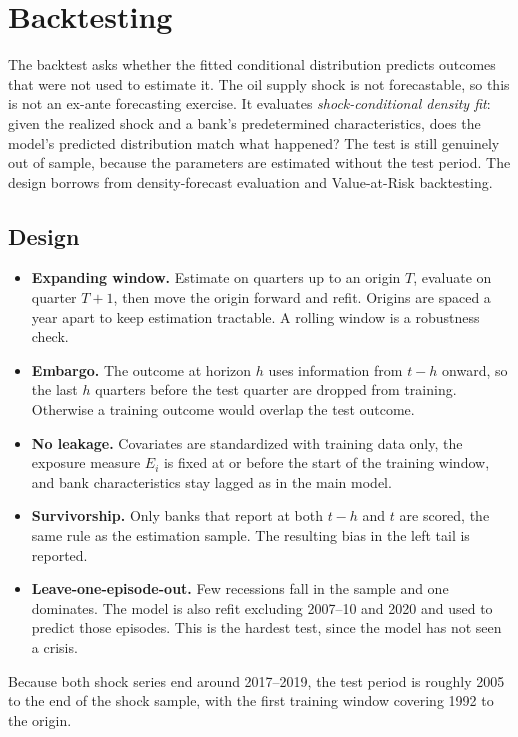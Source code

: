 \documentclass[11pt]{article}
\begin{document}
\section{Backtesting}\label{sec:backtest}

The backtest asks whether the fitted conditional distribution predicts outcomes that were not used to estimate it. The oil supply shock is not forecastable, so this is not an ex-ante forecasting exercise. It evaluates \emph{shock-conditional density fit}: given the realized shock and a bank's predetermined characteristics, does the model's predicted distribution match what happened? The test is still genuinely out of sample, because the parameters are estimated without the test period. The design borrows from density-forecast evaluation \citep{gneiting2007} and Value-at-Risk backtesting.

\subsection{Design}

\begin{itemize}
  \item \textbf{Expanding window.} Estimate on quarters up to an origin $T$, evaluate on quarter $T+1$, then move the origin forward and refit. Origins are spaced a year apart to keep estimation tractable. A rolling window is a robustness check.
  \item \textbf{Embargo.} The outcome at horizon $h$ uses information from $t-h$ onward, so the last $h$ quarters before the test quarter are dropped from training. Otherwise a training outcome would overlap the test outcome.
  \item \textbf{No leakage.} Covariates are standardized with training data only, the exposure measure $E_i$ is fixed at or before the start of the training window, and bank characteristics stay lagged as in the main model.
  \item \textbf{Survivorship.} Only banks that report at both $t-h$ and $t$ are scored, the same rule as the estimation sample. The resulting bias in the left tail is reported.
  \item \textbf{Leave-one-episode-out.} Few recessions fall in the sample and one dominates. The model is also refit excluding 2007--10 and 2020 and used to predict those episodes. This is the hardest test, since the model has not seen a crisis.
\end{itemize}
Because both shock series end around 2017--2019, the test period is roughly 2005 to the end of the shock sample, with the first training window covering 1992 to the origin.
\end{document}
